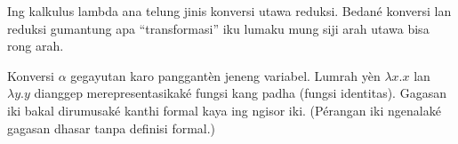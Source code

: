 \documentclass[../../../include/open-logic-section]{subfiles}
\begin{document}

Ing kalkulus lambda ana telung jinis konversi utawa reduksi.
Bedané konversi lan reduksi gumantung apa ``transformasi''
iku lumaku mung siji arah utawa bisa rong arah.

Konversi $\alpha$ gegayutan karo panggantèn jeneng variabel.
Lumrah yèn $\lambda x. x$ lan $\lambda y.y$ dianggep
merepresentasikaké fungsi kang padha (fungsi identitas).
Gagasan iki bakal dirumusaké kanthi formal kaya ing ngisor iki.
(Pérangan iki ngenalaké gagasan dhasar tanpa definisi formal.)
\end{document}

